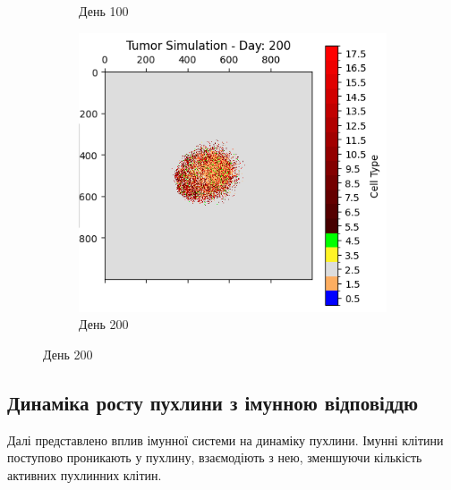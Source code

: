 \documentclass{article}
\begin{document}
\begin{figure}[H]
\begin{subfigure}[t]{0.32\linewidth}
        \caption{День 100}
        \label{fig:tumor-day-100-no-immune}
    \end{subfigure}
    \hfill
    \begin{subfigure}[t]{0.32\linewidth}
        \centering
        \includegraphics[width=\linewidth]{tumor_simulation_stats/tumor_day_200.png}
        \caption{День 200}
        \label{fig:tumor-day-200-no-immune}
    \end{subfigure}
    \label{fig:tumor-evolution-no-immune}
\end{figure}

\subsection{Динаміка росту пухлини з імунною відповіддю}
Далі представлено вплив імунної системи на динаміку пухлини. Імунні клітини поступово проникають у пухлину, взаємодіють з нею, зменшуючи кількість активних пухлинних клітин.
\end{document}
